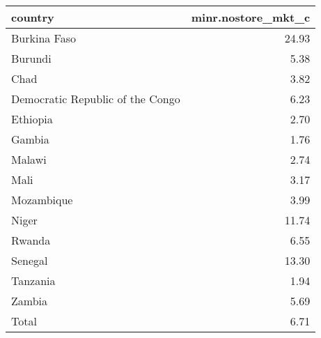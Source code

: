 \begin{table}[ht]
\centering
\begin{tabular}{lr}
  \hline
country & minr.nostore\_mkt\_c \\ 
  \hline
Burkina Faso & 24.93 \\ 
  Burundi & 5.38 \\ 
  Chad & 3.82 \\ 
  Democratic Republic of the Congo & 6.23 \\ 
  Ethiopia & 2.70 \\ 
  Gambia & 1.76 \\ 
  Malawi & 2.74 \\ 
  Mali & 3.17 \\ 
  Mozambique & 3.99 \\ 
  Niger & 11.74 \\ 
  Rwanda & 6.55 \\ 
  Senegal & 13.30 \\ 
  Tanzania & 1.94 \\ 
  Zambia & 5.69 \\ 
  Total & 6.71 \\ 
   \hline
\end{tabular}
\end{table}
